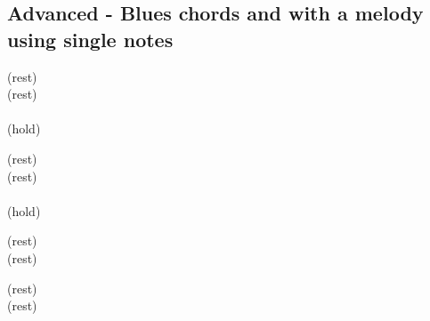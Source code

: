     \subsection{Advanced - Blues chords and with a melody using single notes}
       
    
        \spaceInvisDot
        \ottd \ottb \ottd (rest)\\    
        \ottd \ottb \ottd (rest)\\    
        \2 \3 \\
        \4  (hold)
        
        \vspace{0.2cm}
        \hline
        \spaceInvisDot
        \ottd \ottb \ottd (rest)\\    
        \ottd \ottb \ottd (rest)\\    
        \4 \four \\
        \3  (hold) 
        
        \vspace{0.2cm}
                \hline
        \spaceInvisDot
        \ottd \ottb \ottd (rest)\\    
        \ottd \ottb \ottd (rest)\\    
        \4\fdb\3\2   

        \vspace{0.2cm}
                \hline
        \spaceInvisDot
        \ottd \ottb \ottd (rest)\\    
        \ottd \ottb \ottd (rest)\\    
        \4\fdb\3\2   
        
        \vspace{0.2cm}
        